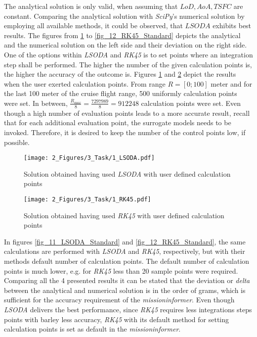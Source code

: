 The analytical solution is only valid, when
assuming that $LoD, AoA, TSFC$
are constant. Comparing the analytical solution 
with \emph{SciPy}'s numerical solution by employing 
all available  methods, it could be observed, that 
$LSODA$ exhibits best results. The figures from 
\ref{fig_9_LSODA} to \ref{fig_12_RK45_Standard} depicts 
the analytical and the numerical solution on the left 
side and their deviation on the right side. One of the 
options within \emph{LSODA} and \emph{RK45}
is to set points where an integration step shall be 
performed. The higher the number of the given 
calculation points is, the higher the accuracy of 
the outcome is. Figures \ref{fig_9_LSODA} and 
\ref{fig_10_RK45} depict the results when 
the user exerted calculation points. From range 
$R = [0;100]$ meter and for the last 100 meter of the 
cruise flight range, 500 uniformly 
calculation points were set. In between, 
$\frac{R_{max}}{8} = \frac{7297989}{8} = 912248 $
calculation points were set. Even though 
a high number of evaluation points 
leads to a more accurate result, recall that for 
each additional evaluation point, the 
surrogate models needs to be invoked. Therefore, 
it is desired to keep the number 
of the control points low, if possible.\newline

\begin{figure}[!h]
    \centering
    \texttt{[image: 2\_Figures/3\_Task/1\_LSODA.pdf]}
    \caption{Solution obtained having used \emph{LSODA} with user defined 
    calculation points}
    \label{fig_9_LSODA}
\end{figure}
%
%
\begin{figure}[!h]
    \centering
    \texttt{[image: 2\_Figures/3\_Task/1\_RK45.pdf]}
    \caption{Solution obtained having used \emph{RK45} with user defined 
    calculation points}
    \label{fig_10_RK45}
\end{figure}


In figures \ref{fig_11_LSODA_Standard} and \ref{fig_12_RK45_Standard},
the same calculations are performed with \emph{LSODA} and \emph{RK45}, 
respectively, but with their methods default number 
of calculation points. The default number of calculation 
points is much lower, e.g. for \emph{RK45} less than 20 sample 
points were required. Comparing all the 4 presented
results it can be stated that the deviation or \emph{delta} 
between the analytical and numerical solution is 
in the order of grams, which is
sufficient for 
the accuracy requirement of the \emph{missioninformer}.
Even though \emph{LSODA} delivers the best performance, 
since \emph{RK45} requires less integrations steps 
points with barley less accuracy, \emph{RK45} with 
its default method for setting calculation 
points is set as default in the \emph{missioninformer}.


